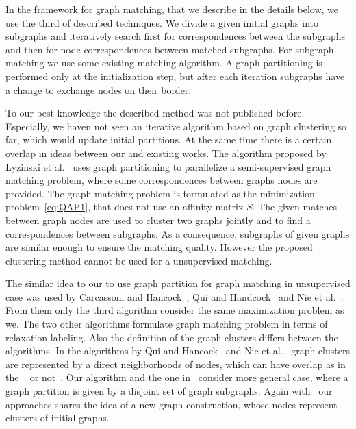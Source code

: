 In the framework for graph matching, that we describe in the details below, we use the third of described techniques. We divide a given initial graphs into subgraphs and iteratively search first for correspondences between the subgraphs and then for node correspondences between matched subgraphs. For subgraph matching we use some existing matching algorithm. A graph partitioning is performed only at the initialization step, but after each iteration subgraphs have a change to exchange nodes on their border.

To our best knowledge the described method was not published before. Especially, we haven not seen an iterative algorithm based on graph clustering so far, which would update initial partitions. At the same time there is a certain overlap in ideas between our and existing works. The algorithm proposed by Lyzinski et al.~\cite{Lyzinski2015} uses graph partitioning to parallelize a semi-supervised graph matching problem, where some correspondences between graphs nodes are provided. The graph matching problem is formulated as the minimization problem~\eqref{eq:QAP1}, that does not use an affinity matrix $S$. The given matches between graph nodes are used to cluster two graphs jointly and to find a correspondences between subgraphs. As a consequence, subgraphs of given graphs are similar enough to ensure the matching quality. However the proposed clustering method cannot be used for a unsupervised matching.

The similar idea to our to use graph partition for graph matching in unsupervised case was used by Carcassoni and Hancock~\cite{Hancock_ModalClusters}, Qui and Handcock~\cite{Hancock_GM_SpectralPart} and Nie et al.~\cite{CliqueGraph_CVPR2015}. From them only the third algorithm consider the same maximization problem as we. The two other algorithms formulate graph matching problem in terms of relaxation labeling. Also the definition of the graph clusters differs between the algorithms. In the algorithms by Qui and Hancock~\cite{Hancock_GM_SpectralPart} and Nie et al.~\cite{CliqueGraph_CVPR2015} graph clusters are represented by a direct neighborhoods of nodes, which can have overlap as in the ~\cite{CliqueGraph_CVPR2015} or not~\cite{Hancock_GM_SpectralPart}. Our algorithm and the one in~\cite{Hancock_ModalClusters} consider more general case, where a graph partition is given by a disjoint set of graph subgraphs.
Again with~\cite{Hancock_GM_SpectralPart} our approaches shares the idea of a new graph construction, whose nodes represent clusters of initial graphs.


